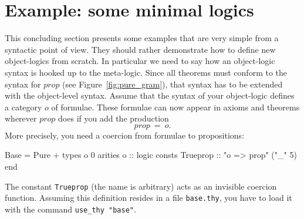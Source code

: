 \section{Example: some minimal logics} \label{sec:min_logics}

This concluding section presents some examples that are very simple from a
syntactic point of view. They should rather demonstrate how to define new
object-logics from scratch. In particular we need to say how an object-logic
syntax is hooked up to the meta-logic. Since all theorems must conform to the
syntax for $prop$ (see Figure~\ref{fig:pure_gram}), that syntax has to be
extended with the object-level syntax. Assume that the syntax of your
object-logic defines a category $o$ of formulae. These formulae can now
appear in axioms and theorems wherever $prop$ does if you add the production
\[ prop ~=~ o. \]
More precisely, you need a coercion from formulae to propositions:
\begin{ttbox}
Base = Pure +
types
  o 0
arities
  o :: logic
consts
  Trueprop :: "o => prop"   ("_" 5)
end
\end{ttbox}
The constant {\tt Trueprop} (the name is arbitrary) acts as an invisible
coercion function. Assuming this definition resides in a file {\tt base.thy},
you have to load it with the command {\tt use_thy "base"}.

